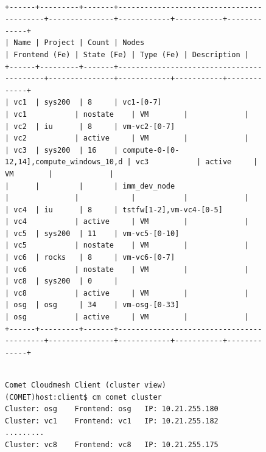 \begin{figure}[htb] 
\begin{small}
\begin{verbatim}

+------+---------+-------+------------------------------------------+---------------+------------+-----------+-------------+
| Name | Project | Count | Nodes                                    | Frontend (Fe) | State (Fe) | Type (Fe) | Description |
+------+---------+-------+------------------------------------------+---------------+------------+-----------+-------------+
| vc1  | sys200  | 8     | vc1-[0-7]                                | vc1           | nostate    | VM        |             |
| vc2  | iu      | 8     | vm-vc2-[0-7]                             | vc2           | active     | VM        |             |
| vc3  | sys200  | 16    | compute-0-[0-12,14],compute_windows_10,d | vc3           | active     | VM        |             |
|      |         |       | imm_dev_node                             |               |            |           |             |
| vc4  | iu      | 8     | tstfw[1-2],vm-vc4-[0-5]                  | vc4           | active     | VM        |             |
| vc5  | sys200  | 11    | vm-vc5-[0-10]                            | vc5           | nostate    | VM        |             |
| vc6  | rocks   | 8     | vm-vc6-[0-7]                             | vc6           | nostate    | VM        |             |
| vc8  | sys200  | 0     |                                          | vc8           | active     | VM        |             |
| osg  | osg     | 34    | vm-osg-[0-33]                            | osg           | active     | VM        |             |
+------+---------+-------+------------------------------------------+---------------+------------+-----------+-------------+
\end{verbatim}
\end{small}
\end{figure}

\begin{figure}[htb] 
\begin{small}
\begin{verbatim}

Comet Cloudmesh Client (cluster view)
(COMET)host:client$ cm comet cluster
Cluster: osg	Frontend: osg	IP: 10.21.255.180
Cluster: vc1	Frontend: vc1	IP: 10.21.255.182
.........
Cluster: vc8	Frontend: vc8	IP: 10.21.255.175
\end{verbatim}
\end{small}
\end{figure}


